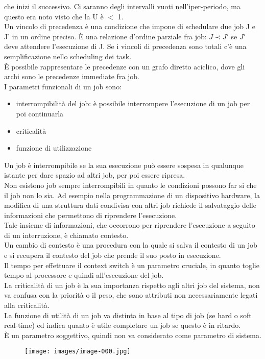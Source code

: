 \documentclass[12pt, oneside]{extbook}
\begin{document}
che inizi il successivo. Ci saranno degli intervalli vuoti nell'iper-periodo, ma questo era noto visto che la U è $<$ 1.\\ Un vincolo di precedenza è una condizione che impone di schedulare due job J e J' in un ordine preciso. È una relazione d'ordine parziale fra job: $J \prec J'$ se $J'$ deve attendere l'esecuzione di J. Se i vincoli di precedenza sono totali c'è una semplificazione nello scheduling dei task.\\ È possibile rappresentare le precedenze con un grafo diretto aciclico, dove gli archi sono le precedenze immediate fra job.\\ I parametri funzionali di un job sono:
\begin{itemize}
\item interrompibilità del job: è possibile interrompere l'esecuzione di un job per poi continuarla
\item criticalità
\item funzione di utilizzazione
\end{itemize}
Un job è interrompibile se la sua esecuzione può essere sospesa in qualunque istante per dare spazio ad altri job, per poi essere ripresa.\\ Non esistono job sempre interrompibili in quanto le condizioni possono far si che il job non lo sia. Ad esempio nella programmazione di un dispositivo hardware, la modifica di una struttura dati condivisa con altri job richiede il salvataggio delle informazioni che permettono di riprendere l'esecuzione.\\ Tale insieme di informazioni, che occorrono per riprendere l'esecuzione a seguito di un interruzione, è chiamato contesto.\\ Un cambio di contesto è una procedura con la quale si salva il contesto di un job e si recupera il contesto del job che prende il suo posto in esecuzione.\\ Il tempo per effettuare il context switch è un parametro cruciale, in quanto toglie tempo al processore e quindi all'esecuzione del job.\\ La criticalità di un job è la sua importanza rispetto agli altri job del sistema, non va confusa con la priorità o il peso, che sono attributi non necessariamente legati alla criticalità.\\ La funzione di utilità di un job va distinta in base al tipo di job (se hard o soft real-time) ed indica quanto è utile completare un job se questo è in ritardo.\\ È un parametro soggettivo, quindi non va considerato come parametro di sistema.\\
\begin{figure}[!h]
\centering
\texttt{[image: images/image-000.jpg]}
\end{figure}
\end{document}
